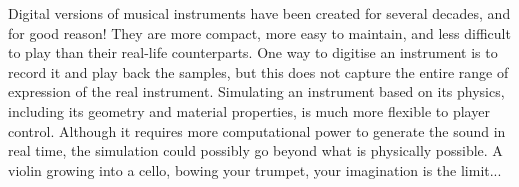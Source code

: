 \pagebreak
\pagestyle{empty}
\justify
{}Digital versions of musical instruments have been created for several decades, and for good reason! They are more compact, more easy to maintain, and less difficult to play than their real-life counterparts. One way to digitise an instrument is to record it and play back the samples, but this does not capture the entire range of expression of the real instrument. Simulating an instrument based on its physics, including its geometry and material properties, is much more flexible to player control. Although it requires more computational power to generate the sound in real time, the simulation could possibly go beyond what is physically possible. A violin growing into a cello, bowing your trumpet, your imagination is the limit...

